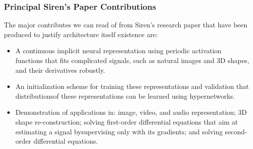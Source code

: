 



\begin{frame}
\frametitle{Principal Siren's Paper Contributions}
The major contributes we can read of from Siren's research paper that have been produced to justify architecture itself existence are:

\begin{itemize}
\item A continuous implicit neural representation using periodic activation functions that fits complicated signals, such as natural images and 3D shapes, and their derivatives robustly.
\item An initialization scheme for training these representations and validation that distributionsof these representations can be learned using hypernetworks.
\item Demonstration of applications in:  image, video, and audio representation; 3D shape re-construction; solving first-order differential equations that aim at estimating a signal bysupervising only with its gradients; and solving second-order differential equations.
\end{itemize}
\end{frame}